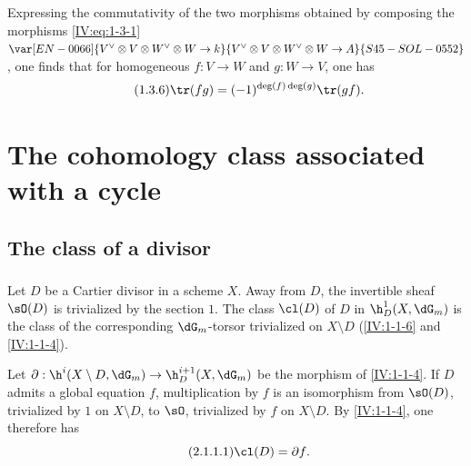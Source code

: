 Expressing the commutativity of the two morphisms obtained by composing the
morphisms \eqref{IV:eq:1-3-1}
$\var[EN-0066]{V^\vee\otimes V\otimes W^\vee\otimes W\to k}{V^\vee\otimes V\otimes W^\vee\otimes W\to A}{S45-SOL-0552}$, one finds that for homogeneous
$f:V\to W$ and $g:W\to V$, one has
\begin{equation*}\tag{1.3.6}\label{IV:eq:1-3-6}
  \tr(f g) = (-1)^{\deg(f)\deg(g)} \tr(g f) \text{.}
\end{equation*}




















\section{The cohomology class associated with a cycle}\label{IV:2}










\subsection{The class of a divisor}\label{IV:2-1}






\subsubsection{}\label{IV:2-1-1}

Let $D$ be a Cartier divisor in a scheme $X$. Away from $D$, the invertible
sheaf $\sO(D)$ is trivialized by the section $1$. The class $\cl(D)$ of $D$
in $\h_D^1(X,\dG_m)$ is the class of the corresponding $\dG_m$-torsor
trivialized on $X\setminus D$ (\ref{IV:1-1-6} and \ref{IV:1-1-4}).

Let $\partial:\h^i(X\setminus D,\dG_m)\to \h_D^{i+1}(X,\dG_m)$ be the morphism
of \ref{IV:1-1-4}. If $D$ admits a global equation $f$, multiplication by
$f$ is an isomorphism from $\sO(D)$, trivialized by $1$ on $X\setminus D$,
to $\sO$, trivialized by $f$ on $X\setminus D$. By \ref{IV:1-1-4}, one
therefore has
\begin{equation*}\tag{2.1.1.1}\label{IV:eq:2-1-1}
  \cl(D) = \partial f \text{.}
\end{equation*}

